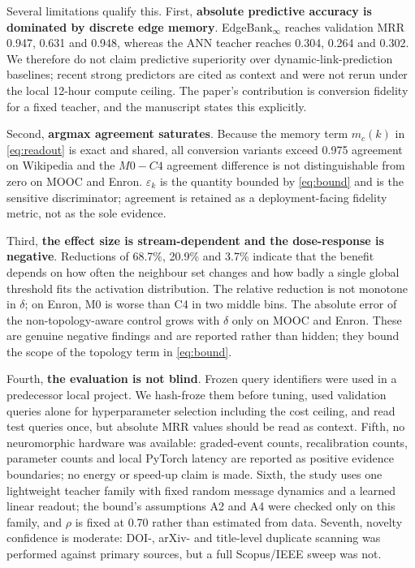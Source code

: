 \documentclass[preprint,12pt]{elsarticle}
\begin{document}
Several limitations qualify this. First, \textbf{absolute predictive accuracy is dominated by discrete edge memory}. EdgeBank$_\infty$ reaches validation MRR 0.947, 0.631 and 0.948, whereas the ANN teacher reaches 0.304, 0.264 and 0.302. We therefore do not claim predictive superiority over dynamic-link-prediction baselines; recent strong predictors \cite{rossi2020tgn,yu2023dyglib,gao2025hyperevent} are cited as context and were not rerun under the local 12-hour compute ceiling. The paper's contribution is conversion fidelity for a fixed teacher, and the manuscript states this explicitly.

Second, \textbf{argmax agreement saturates}. Because the memory term $m_c(k)$ in \eqref{eq:readout} is exact and shared, all conversion variants exceed 0.975 agreement on Wikipedia and the $M0-C4$ agreement difference is not distinguishable from zero on MOOC and Enron. $\varepsilon_k$ is the quantity bounded by \eqref{eq:bound} and is the sensitive discriminator; agreement is retained as a deployment-facing fidelity metric, not as the sole evidence.

Third, \textbf{the effect size is stream-dependent and the dose-response is negative}. Reductions of 68.7\%, 20.9\% and 3.7\% indicate that the benefit depends on how often the neighbour set changes and how badly a single global threshold fits the activation distribution. The relative reduction is not monotone in $\delta$; on Enron, M0 is worse than C4 in two middle bins. The absolute error of the non-topology-aware control grows with $\delta$ only on MOOC and Enron. These are genuine negative findings and are reported rather than hidden; they bound the scope of the topology term in \eqref{eq:bound}.

Fourth, \textbf{the evaluation is not blind}. Frozen query identifiers were used in a predecessor local project. We hash-froze them before tuning, used validation queries alone for hyperparameter selection including the cost ceiling, and read test queries once, but absolute MRR values should be read as context. Fifth, no neuromorphic hardware was available: graded-event counts, recalibration counts, parameter counts and local PyTorch latency are reported as positive evidence boundaries; no energy or speed-up claim is made. Sixth, the study uses one lightweight teacher family with fixed random message dynamics and a learned linear readout; the bound's assumptions A2 and A4 were checked only on this family, and $\rho$ is fixed at 0.70 rather than estimated from data. Seventh, novelty confidence is moderate: DOI-, arXiv- and title-level duplicate scanning was performed against primary sources, but a full Scopus/IEEE sweep was not.
\end{document}
